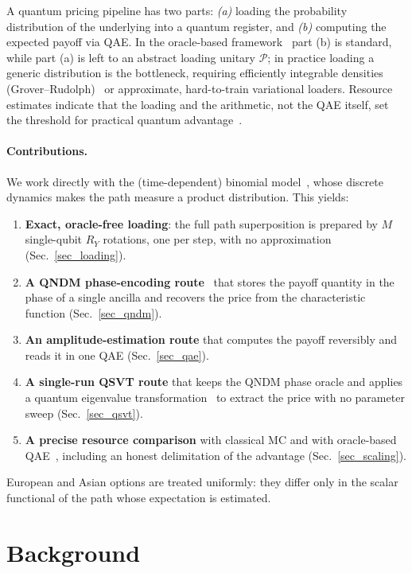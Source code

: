 \documentclass[11pt]{article}
\begin{document}
A quantum pricing pipeline has two parts: \emph{(a)} loading the probability distribution of the underlying into a quantum register, and \emph{(b)} computing the expected payoff via QAE. In the oracle-based framework~\cite{Stamatopoulos_2020} part (b) is standard, while part (a) is left to an abstract loading unitary $\mathcal{P}$; in practice loading a generic distribution is the bottleneck, requiring efficiently integrable densities (Grover--Rudolph)~\cite{grover2002creating} or approximate, hard-to-train variational loaders. Resource estimates indicate that the loading and the arithmetic, not the QAE itself, set the threshold for practical quantum advantage~\cite{chakrabarti2021threshold}.

\paragraph{Contributions.} We work directly with the (time-dependent) binomial model~\cite{COX1979229,Kim_2017}, whose discrete dynamics makes the path measure a product distribution. This yields:
\begin{enumerate}
    \item \textbf{Exact, oracle-free loading}: the full path superposition is prepared by $M$ single-qubit $R_Y$ rotations, one per step, with no approximation (Sec.~\ref{sec_loading}).
    \item \textbf{A QNDM phase-encoding route}~\cite{espa_2023} that stores the payoff quantity in the phase of a single ancilla and recovers the price from the characteristic function (Sec.~\ref{sec_qndm}).
    \item \textbf{An amplitude-estimation route} that computes the payoff reversibly and reads it in one QAE (Sec.~\ref{sec_qae}).
    \item \textbf{A single-run QSVT route} that keeps the QNDM phase oracle and applies a quantum eigenvalue transformation~\cite{gilyen2019qsvt,dong2022qetu} to extract the price with no parameter sweep (Sec.~\ref{sec_qsvt}).
    \item \textbf{A precise resource comparison} with classical MC and with oracle-based QAE~\cite{Stamatopoulos_2020}, including an honest delimitation of the advantage (Sec.~\ref{sec_scaling}).
\end{enumerate}
European and Asian options are treated uniformly: they differ only in the scalar functional of the path whose expectation is estimated.

\section{Background}
\end{document}
